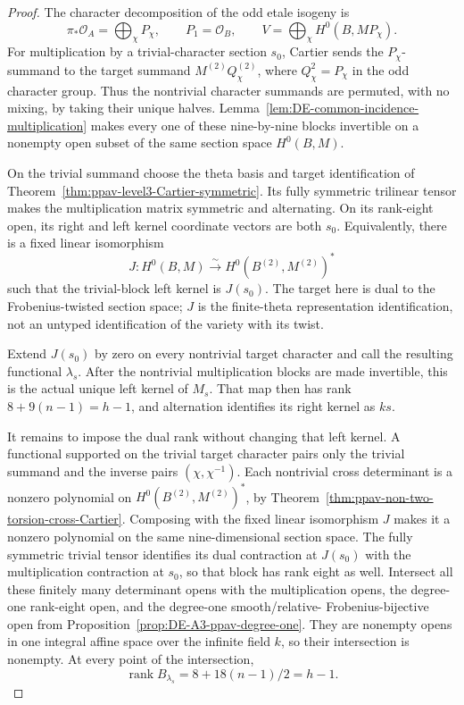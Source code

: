 \begin{proof}
The character decomposition of the odd etale isogeny is
\[
 \pi_*\mathcal O_A=\bigoplus_\chi P_\chi,
 \qquad P_1=\mathcal O_B,
 \qquad V=\bigoplus_\chi H^0(B,MP_\chi).
                                                        \tag{DE-CI5}
\]
For multiplication by a trivial-character section \(s_0\),
Cartier sends the \(P_\chi\)-summand to the target summand
\(M^{(2)}Q_\chi^{(2)}\), where \(Q_\chi^2=P_\chi\)
in the odd character group.  Thus the nontrivial character
summands are permuted, with no mixing, by taking their unique
halves.  Lemma~\ref{lem:DE-common-incidence-multiplication}
makes every one of these nine-by-nine blocks invertible on
a nonempty open subset of the same section space \(H^0(B,M)\).

On the trivial summand choose the theta basis and target
identification of Theorem~\ref{thm:ppav-level3-Cartier-symmetric}.
Its fully symmetric trilinear tensor makes the multiplication
matrix symmetric and alternating.  On its rank-eight open,
its right and left kernel coordinate vectors are both \(s_0\).
Equivalently, there is a fixed linear isomorphism
\[
 J:H^0(B,M)\xrightarrow{\ \sim\ }
            H^0(B^{(2)},M^{(2)})^*
\]
such that the trivial-block left kernel is \(J(s_0)\).
The target here is dual to the Frobenius-twisted section space;
\(J\) is the finite-theta representation identification, not
an untyped identification of the variety with its twist.

Extend \(J(s_0)\) by zero on every nontrivial target character
and call the resulting functional \(\lambda_s\).  After the
nontrivial multiplication blocks are made invertible, this is
the actual unique left kernel of \(M_s\).  That map then has
rank \(8+9(n-1)=h-1\), and alternation identifies its right
kernel as \(ks\).

It remains to impose the dual rank without changing that left
kernel.  A functional supported on the trivial target character
pairs only the trivial summand and the inverse pairs
\((\chi,\chi^{-1})\).  Each nontrivial cross determinant is
a nonzero polynomial on
\(H^0(B^{(2)},M^{(2)})^*\), by
Theorem~\ref{thm:ppav-non-two-torsion-cross-Cartier}.
Composing with the fixed linear isomorphism \(J\) makes it a
nonzero polynomial on the same nine-dimensional section space.
The fully symmetric trivial tensor identifies its dual contraction
at \(J(s_0)\) with the multiplication contraction at \(s_0\),
so that block has rank eight as well.  Intersect all these
finitely many determinant opens with the multiplication opens,
the degree-one rank-eight open, and the degree-one smooth/relative-
Frobenius-bijective open from Proposition~\ref{prop:DE-A3-ppav-degree-one}.
They are nonempty opens in one integral affine space over the
infinite field \(k\), so their intersection is nonempty.
At every point of the intersection,
\[
                 \operatorname{rank}B_{\lambda_s}
                      =8+18(n-1)/2=h-1.
                                                        \tag{DE-CI6}
\]


\end{proof}
